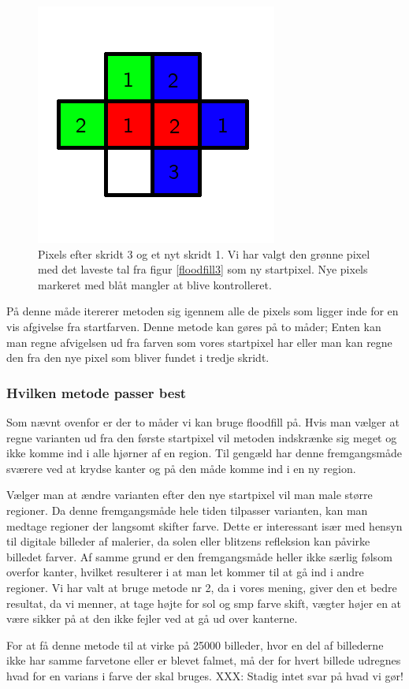 {\begin{figure}[!h]
    \begin{center}
        \includegraphics[scale=0.42,angle=0]{afsnit/vores_implementation/billeder/flood_fill/floodfill4}
    \end{center}
    \caption[]{Pixels efter skridt 3 og et nyt skridt 1. Vi har valgt
    den grønne pixel med det laveste tal fra figur \ref{floodfill3} som
    ny startpixel. Nye pixels markeret med blåt mangler at blive
    kontrolleret.}
    \label{floodfill4}
\end{figure}

På denne måde itererer metoden sig igennem alle de pixels som ligger
inde for en vis afgivelse fra startfarven. Denne metode kan gøres på to
måder; Enten kan man regne afvigelsen ud fra farven som vores startpixel
har eller man kan regne den fra den nye pixel som bliver fundet i tredje
skridt.

\subsubsection{Hvilken metode passer best}
Som nævnt ovenfor er der to måder vi kan bruge floodfill på. Hvis man
vælger at regne varianten ud fra den første startpixel vil metoden
indskrænke sig meget og ikke komme ind i alle hjørner af en region. Til
gengæld har denne fremgangsmåde sværere ved at krydse kanter og på den
måde komme ind i en ny region.

Vælger man at ændre varianten efter den nye startpixel vil man male
større regioner. Da denne fremgangsmåde hele tiden tilpasser varianten,
kan man medtage regioner der langsomt skifter farve. Dette er
interessant især med hensyn til digitale billeder af malerier, da solen
eller blitzens refleksion kan påvirke billedet farver. Af samme grund er
den fremgangsmåde heller ikke særlig følsom overfor kanter, hvilket
resulterer i at man let kommer til at gå ind i andre regioner.
Vi har valt at bruge metode nr 2, da i vores mening, giver den
et bedre resultat, da vi menner, at tage højte for sol og smp farve
skift, vægter højer en at være sikker på at den ikke fejler ved at gå ud
over kanterne.

For at få denne metode til at virke på 25000 billeder, hvor en del af
billederne ikke har samme farvetone eller er blevet falmet, må der
for hvert billede udregnes hvad for en varians i farve der skal bruges.
XXX: Stadig intet svar på hvad vi gør!

}

